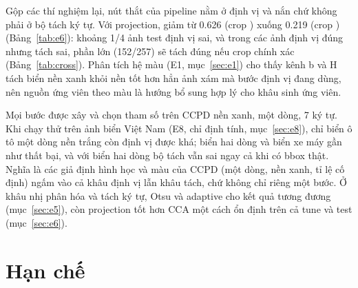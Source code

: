 Gộp các thí nghiệm lại, nút thắt của pipeline nằm ở định vị và nắn chứ không phải ở bộ tách ký tự. Với projection,  giảm từ 0.626 (crop ) xuống 0.219 (crop ) (Bảng~\ref{tab:e6}): khoảng 1/4 ảnh test định vị sai, và trong các ảnh định vị đúng nhưng tách sai, phần lớn (152/257) sẽ tách đúng nếu crop chính xác (Bảng~\ref{tab:cross}). Phân tích hệ màu (E1, mục~\ref{sec:e1}) cho thấy kênh b và H tách biển nền xanh khỏi nền tốt hơn hẳn ảnh xám mà bước định vị đang dùng, nên nguồn ứng viên theo màu là hướng bổ sung hợp lý cho khâu sinh ứng viên.

Mọi bước được xây và chọn tham số trên CCPD nền xanh, một dòng, 7 ký tự. Khi chạy thử trên ảnh biển Việt Nam (E8, chỉ định tính, mục~\ref{sec:e8}), chỉ biển ô tô một dòng nền trắng còn định vị được khá; biển hai dòng và biển xe máy gần như thất bại, và với biển hai dòng bộ tách vẫn sai ngay cả khi có bbox thật. Nghĩa là các giả định hình học và màu của CCPD (một dòng, nền xanh, tỉ lệ cố định) ngấm vào cả khâu định vị lẫn khâu tách, chứ không chỉ riêng một bước. Ở khâu nhị phân hóa và tách ký tự, Otsu và adaptive cho kết quả tương đương (mục~\ref{sec:e5}), còn projection tốt hơn CCA một cách ổn định trên cả tune và test (mục~\ref{sec:e6}).

\section{Hạn chế}
\label{sec:limits}

